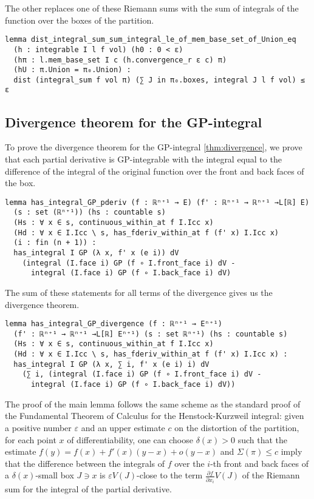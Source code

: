 \documentclass[a4paper, UKenglish,cleveref, autoref, thm-restate]{lipics-v2021}
\newcommand{\eps}{\varepsilon}
\begin{document}
The other replaces one of these Riemann sums with the sum of integrals
of the function over the boxes of the partition.

\begin{lstlisting}
lemma dist_integral_sum_sum_integral_le_of_mem_base_set_of_Union_eq
  (h : integrable I l f vol) (h0 : 0 < ε)
  (hπ : l.mem_base_set I c (h.convergence_r ε c) π)
  (hU : π.Union = π₀.Union) :
  dist (integral_sum f vol π) (∑ J in π₀.boxes, integral J l f vol) ≤ ε
\end{lstlisting}

\subsection{Divergence theorem for the GP-integral}%
\label{sec:diverg-theor-gp}

To prove the divergence theorem for the GP-integral
\autoref{thm:divergence}, we prove that each partial derivative is
GP-integrable with the integral equal to the difference of the
integral of the original function over the front and back faces of the
box.

\begin{lstlisting}[caption={Key lemma for the divergence theorem for the GP-integral}]
lemma has_integral_GP_pderiv (f : ℝⁿ⁺¹ → E) (f' : ℝⁿ⁺¹ → ℝⁿ⁺¹ →L[ℝ] E)
  (s : set (ℝⁿ⁺¹)) (hs : countable s)
  (Hs : ∀ x ∈ s, continuous_within_at f I.Icc x)
  (Hd : ∀ x ∈ I.Icc \ s, has_fderiv_within_at f (f' x) I.Icc x)
  (i : fin (n + 1)) :
  has_integral I GP (λ x, f' x (e i)) dV
    (integral (I.face i) GP (f ∘ I.front_face i) dV -
      integral (I.face i) GP (f ∘ I.back_face i) dV)
\end{lstlisting}

The sum of these statements for all terms of the divergence gives us
the divergence theorem.

\begin{lstlisting}[caption={The divergence theorem for the GP-integral},label=lst:divergence-GP]
lemma has_integral_GP_divergence (f : ℝⁿ⁺¹ → Eⁿ⁺¹)
  (f' : ℝⁿ⁺¹ → ℝⁿ⁺¹ →L[ℝ] Eⁿ⁺¹) (s : set ℝⁿ⁺¹) (hs : countable s)
  (Hs : ∀ x ∈ s, continuous_within_at f I.Icc x)
  (Hd : ∀ x ∈ I.Icc \ s, has_fderiv_within_at f (f' x) I.Icc x) :
  has_integral I GP (λ x, ∑ i, f' x (e i) i) dV
    (∑ i, (integral (I.face i) GP (f ∘ I.front_face i) dV -
      integral (I.face i) GP (f ∘ I.back_face i) dV))
\end{lstlisting}

The proof of the main lemma follows the same scheme as the standard
proof of the Fundamental Theorem of Calculus for the Henstock-Kurzweil
integral: given a positive number \(\eps\) and an upper estimate \(c\)
on the distortion of the partition, for each point \(x\) of
differentiability, one can choose \(\delta(x)>0\) such that the
estimate \(f(y)=f(x)+f'(x)(y-x)+o(y-x)\) and \(\Sigma(\pi)\le c\)
imply that the difference between the integrals of
\(f\) over the \(i\)-th front and back faces of a \(\delta(x)\)-small
box \(J\ni x\) is \(\eps V(J)\)-close to the term
\(\frac{\partial f}{\partial x_{i}}V(J)\) of the Riemann sum for the
integral of the partial derivative.
\end{document}
